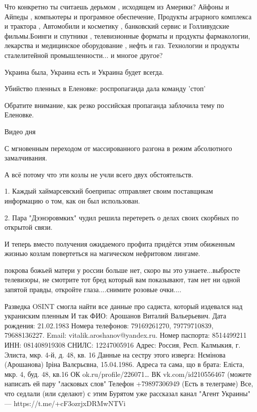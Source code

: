 Что конкретно ты считаешь дерьмом , исходящем из Америки? Айфоны и Айпеды ,
компьютеры и програмное обеспечение, Продукты аграрного комплекса и трактора ,
Автомобили и косметику , банковский сервис и Голливудские фильмы.Боинги и
спутники , телевизионные форматы и продукты фармакологии, лекарства и
медицинское оборудование , нефть и газ. Технологии и продукты сталелитейной
промышленности... и многое другое?

Украина была, Украина есть и Украина будет всегда.

Убийство пленных в Еленовке: роспропаганда дала команду 'стоп'

Обратите внимание, как резко российская пропаганда заблочила тему по Еленовке.

Видео дня

С мгновенным переходом от массированного разгона в режим абсолютного
замалчивания.

А всё потому что эти козлы не учли всего двух обстоятельств.

1. Каждый хаймарсевский боеприпас отправляет своим поставщикам информацию о
том, как он был использован.

2. Пара "Дээнэровмких" чудил решила перетереть о делах своих скорбных по
открытой связи.

И теперь вместо получения ожидаемого профита придётся этим обиженным жизнью
козлам повертеться на магическом нефритовом лингаме.

покрова божьей матери у россии больше нет, скоро вы это узнаете...выбросте
телевизоры, не смотрите тот бред который вам показывают, там нет ни одной
запятой правды, откройте глаза....снимите розовые очки....

Разведка OSINT смогла найти все данные про садиста, который издевался над украниским пленным
И так ФИО: Арошанов Виталий Вальерьевич.
Дата рождения: 21.02.1983
Номера телефонов: 79169261270, 79779710839, 79688136227.
Email: vitalik.aroshanov@yandex.ru.
Номер паспорта: 8514499211
ИНН: 081408919308
СНИЛС: 12247005916
Адрес: Россия, Респ. Калмыкия, г. Элиста, мкр. 4-й, д. 48, кв. 16
Данные на сестру этого изверга:
Нємінова (Арошанова) Іріна Валєрьєвна, 15.04.1986. Адреса та сама, що в брата: Еліста, мкр. 4, буд. 48, кв.16
ОК ok.ru/profile/226071…
ВК vk.com/id210556467 (можете написать ей пару "ласковых слов"
Телефон +79897306949 (Есть в телеграме)
Все, что седлали (или сделают) с этим Бурятом уже рассказал канал "Агент Украины" — https://t.me/+cF3ozrjxDRMwNTVi


